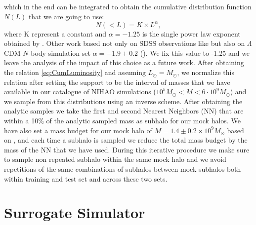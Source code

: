 which in the end can be integrated to obtain the cumulative distribution function $N(L)$ that we are going to use:
\begin{equation}
    N(<L) = K \times L^{\alpha},
\label{eq:CumLuminosity}
\end{equation}
where K represent a constant and $\alpha=-1.25$ is the single power law exponent obtained by \cite{koposovLuminosityFunctionMilky2008}. Other work based not only on SDSS observations like \cite{koposovLuminosityFunctionMilky2008} but also on $\Lambda$CDM $N$-body simulation set $\alpha = -1.9 \pm 0.2$ (\cite{tollerudHundredsMilkyWay2008}). We fix this value to -1.25 and we leave the analysis of the impact of this choice as a future work.
After obtaining the relation \ref{eq:CumLuminosity} and assuming $L_\odot = M_\odot$, we normalize this relation after setting the support to be the interval of masses that we have available in our catalogue of NIHAO simulations ($10^5 M_\odot < M < 6 \cdot 10^9 M_\odot$) and we sample from this distributions using an inverse scheme. After obtaining the analytic samples we take the first and second Nearest Neighbors (NN) that are within a  
10\% of the analytic sampled mass as subhalo for our mock halos. We have also set a mass budget for our mock halo of $M=1.4 \pm 0.2 \times 10^9 M_\odot$ based on \cite{deasonTotalStellarHalo2019}, and each time a subhalo is sampled we reduce the total mass budget by the mass of the NN that we have used. During this iterative procedure we make sure to sample non repeated subhalo within the same mock halo and we avoid repetitions of the same combinations of subhalos between mock subhalos both within training and test set and across these two sets.   
\section{Surrogate Simulator}
